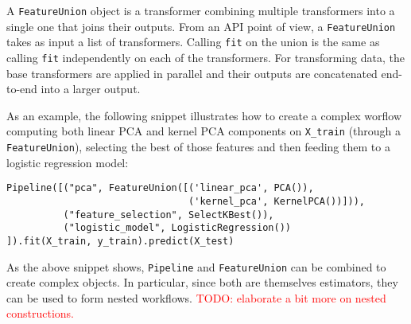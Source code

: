 \documentclass{llncs}
\newcommand{\sklearn}{\textit{scikit-learn}\xspace}
\begin{document}
A \texttt{FeatureUnion} object is a transformer combining multiple transformers
into a single one that joins their outputs. From an API point of view, a
\texttt{FeatureUnion} takes as input a list of transformers. Calling
\texttt{fit} on the union is the same as calling \texttt{fit} independently on
each of the transformers. For transforming data, the base transformers are
applied in parallel and their outputs are concatenated end-to-end into a larger
output.

As an example, the following snippet illustrates how to create a complex worflow
computing both linear PCA and kernel PCA components on \texttt{X\_train} (through a
\texttt{FeatureUnion}), selecting the best of those features and then feeding
them to a logistic regression model:
\begin{verbatim}
Pipeline([("pca", FeatureUnion([('linear_pca', PCA()),
                                ('kernel_pca', KernelPCA())])),
          ("feature_selection", SelectKBest()),
          ("logistic_model", LogisticRegression())
]).fit(X_train, y_train).predict(X_test)
\end{verbatim}

As the above snippet shows, \texttt{Pipeline} and \texttt{FeatureUnion} can be
combined to create complex objects. In particular, since both are themselves
estimators, they can be used to form nested workflows. \textcolor{red}{TODO:
elaborate a bit more on nested constructions.}

\end{document}
